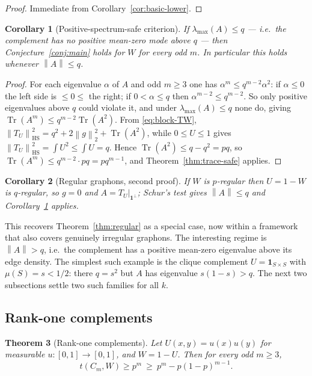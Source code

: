 \documentclass[11pt]{article}
\newtheorem{theorem}{Theorem}[section]
\newtheorem{corollary}[theorem]{Corollary}
\newcommand{\one}{\mathbf 1}
\newcommand{\Tr}{\operatorname{Tr}}
\newcommand{\norm}[1]{\left\|#1\right\|}
\begin{document}
\begin{proof}
Immediate from Corollary~\ref{cor:basic-lower}.
\end{proof}

\begin{corollary}[Positive-spectrum-safe criterion]\label{cor:norm-safe}
If $\lambda_{\max}(A)\le q$ --- i.e.\ the complement has no \emph{positive} mean-zero mode above $q$ --- then Conjecture~\ref{conj:main} holds for $W$ for every odd $m$.  In particular this holds whenever $\norm A\le q$.
\end{corollary}

\begin{proof}
For each eigenvalue $\alpha$ of $A$ and odd $m\ge3$ one has $\alpha^m\le q^{m-2}\alpha^2$: if $\alpha\le0$ the left side is $\le0\le$ the right; if $0<\alpha\le q$ then $\alpha^{m-2}\le q^{m-2}$.  So only positive eigenvalues above $q$ could violate it, and under $\lambda_{\max}(A)\le q$ none do, giving $\Tr(A^m)\le q^{m-2}\Tr(A^2)$.  From \eqref{eq:block-TW}, $\norm{T_U}_{\mathrm{HS}}^2=q^2+2\norm g_2^2+\Tr(A^2)$, while $0\le U\le1$ gives $\norm{T_U}_{\mathrm{HS}}^2=\int U^2\le\int U=q$.  Hence $\Tr(A^2)\le q-q^2=pq$, so $\Tr(A^m)\le q^{m-2}\cdot pq=pq^{m-1}$, and Theorem~\ref{thm:trace-safe} applies.
\end{proof}

\begin{corollary}[Regular graphons, second proof]\label{cor:regular-general}
If $W$ is $p$-regular then $U=1-W$ is $q$-regular, so $g=0$ and $A=T_U|_{\one^\perp}$; Schur's test gives $\norm A\le q$ and Corollary~\ref{cor:norm-safe} applies.
\end{corollary}

This recovers Theorem~\ref{thm:regular} as a special case, now within a framework that also covers genuinely irregular graphons.  The interesting regime is $\norm A>q$, i.e.\ the complement has a positive mean-zero eigenvalue above its edge density.  The simplest such example is the clique complement $U=\mathbf 1_{S\times S}$ with $\mu(S)=s<1/2$: there $q=s^2$ but $A$ has eigenvalue $s(1-s)>q$.  The next two subsections settle two such families for all $k$.

\subsection{Rank-one complements}\label{subsec:rank-one}

\begin{theorem}[Rank-one complements]\label{thm:rank-one}
Let $U(x,y)=u(x)u(y)$ for measurable $u:[0,1]\to[0,1]$, and $W=1-U$.  Then for every odd $m\ge3$,
\[
        t(C_m,W)\ge p^m\ \ge\ p^m-p(1-p)^{m-1}.
\]
\end{theorem}
\end{document}
